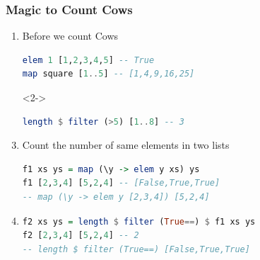 \documentclass[10pt]{beamer}
\begin{document}
\begin{frame}[fragile]
\frametitle{Magic to Count Cows}


\begin{overlayarea}{\linewidth}{.8\textheight}

    \begin{enumerate}
  \setlength\itemsep{0em}
    \item Before we count Cows\\
    \begin{lstlisting}[language=Haskell,numbers=none]
elem 1 [1,2,3,4,5] -- True
map square [1..5] -- [1,4,9,16,25]
    \end{lstlisting}
\item[]<2->%
    \begin{lstlisting}[language=Haskell,numbers=none]
length $ filter (>5) [1..8] -- 3
    \end{lstlisting}


    \item Count the number of same elements in two lists\\
     \begin{lstlisting}[language=Haskell,numbers=none]
f1 xs ys = map (\y -> elem y xs) ys 
f1 [2,3,4] [5,2,4] -- [False,True,True]
-- map (\y -> elem y [2,3,4]) [5,2,4]
    \end{lstlisting}
\item<2->[]%
     \begin{lstlisting}[language=Haskell,numbers=none]
f2 xs ys = length $ filter (True==) $ f1 xs ys
f2 [2,3,4] [5,2,4] -- 2
-- length $ filter (True==) [False,True,True]
    \end{lstlisting}

    \end{enumerate}
\end{overlayarea}
        
\end{frame}


\end{document}
